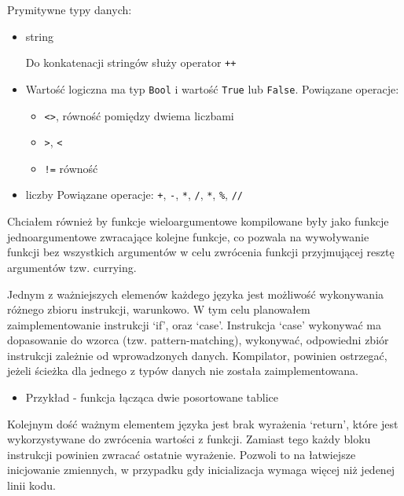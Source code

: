 \documentclass{article}
\begin{document}
Prymitywne typy danych:
\begin{itemize}
  \item string
  
  Do konkatenacji stringów służy operator \lstinline!++!
  \item Wartość logiczna ma typ \lstinline!Bool! i wartość \lstinline!True! lub \lstinline!False!.
  Powiązane operacje:
    \begin{itemize}
      \item \lstinline!<>!, równość pomiędzy dwiema liczbami
      \item \lstinline!>!, \lstinline!<!
      \item \lstinline|!=| równość
    \end{itemize}
    \item liczby
    Powiązane operacje: \lstinline!+!, \lstinline!-!, \lstinline!*!, \lstinline!/!, \lstinline!*!, \lstinline!%!, \lstinline!//!
\end{itemize}


\newpage
Chciałem również by funkcje wieloargumentowe kompilowane były jako funkcje jednoargumentowe zwracające kolejne funkcje, co pozwala na wywoływanie funkcji bez wszystkich argumentów w celu zwrócenia funkcji przyjmującej resztę argumentów tzw. currying.





Jednym z ważniejszych elemenów każdego języka jest możliwość wykonywania różnego zbioru instrukcji, warunkowo. W tym celu planowałem zaimplementowanie instrukcji `if', oraz `case'. Instrukcja `case' wykonywać ma dopasowanie do wzorca (tzw. pattern-matching), wykonywać, odpowiedni zbiór instrukcji zależnie od wprowadzonych danych. Kompilator, powinien ostrzegać, jeżeli ścieżka dla jednego z typów danych nie została zaimplementowana.

\begin{itemize}
  \newpage
  \item Przykład - funkcja łącząca dwie posortowane tablice
        
        
\end{itemize}

\newpage
Kolejnym dość ważnym elementem języka jest brak wyrażenia `return', które jest wykorzystywane do zwrócenia wartości z funkcji. Zamiast tego każdy bloku instrukcji powinien zwracać ostatnie wyrażenie. Pozwoli to na łatwiejsze inicjowanie zmiennych, w przypadku gdy inicializacja wymaga więcej niż jedenej linii kodu.
\end{document}
